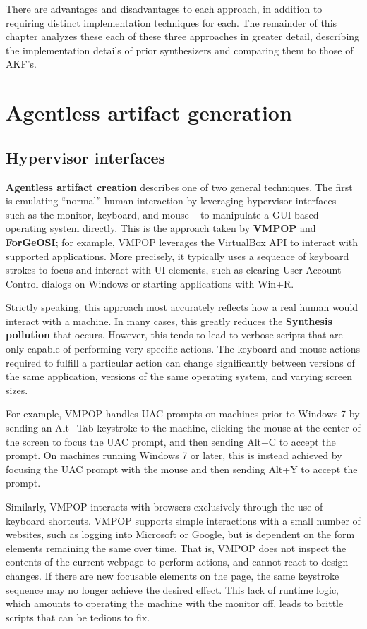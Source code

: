 \documentclass[letterpaper,12pt]{report}
\begin{document}
There are advantages and disadvantages to each approach, in addition to
requiring distinct implementation techniques for each. The remainder of
this chapter analyzes these each of these three approaches in greater
detail, describing the implementation details of prior synthesizers and
comparing them to those of AKF's.

\section{Agentless artifact
generation}\label{agentless-artifact-generation}

\subsection{Hypervisor interfaces}\label{hypervisor-interfaces}

\textbf{Agentless artifact creation} describes one of two general
techniques. The first is emulating ``normal'' human interaction by
leveraging hypervisor interfaces -- such as the monitor, keyboard, and
mouse -- to manipulate a GUI-based operating system directly. This is
the approach taken by \textbf{VMPOP} and \textbf{ForGeOSI}; for example,
VMPOP leverages the VirtualBox API to interact with supported
applications. More precisely, it typically uses a sequence of keyboard
strokes to focus and interact with UI elements, such as clearing User
Account Control dialogs on Windows or starting applications with Win+R.

Strictly speaking, this approach most accurately reflects how a real
human would interact with a machine. In many cases, this greatly reduces
the \textbf{Synthesis pollution} that occurs. However, this tends to
lead to verbose scripts that are only capable of performing very
specific actions. The keyboard and mouse actions required to fulfill a
particular action can change significantly between versions of the same
application, versions of the same operating system, and varying screen
sizes.

For example, VMPOP handles UAC prompts on machines prior to Windows 7 by
sending an Alt+Tab keystroke to the machine, clicking the mouse at the
center of the screen to focus the UAC prompt, and then sending Alt+C to
accept the prompt. On machines running Windows 7 or later, this is
instead achieved by focusing the UAC prompt with the mouse and then
sending Alt+Y to accept the prompt.

Similarly, VMPOP interacts with browsers exclusively through the use of
keyboard shortcuts. VMPOP supports simple interactions with a small
number of websites, such as logging into Microsoft or Google, but is
dependent on the form elements remaining the same over time. That is,
VMPOP does not inspect the contents of the current webpage to perform
actions, and cannot react to design changes. If there are new focusable
elements on the page, the same keystroke sequence may no longer achieve
the desired effect. This lack of runtime logic, which amounts to
operating the machine with the monitor off, leads to brittle scripts
that can be tedious to fix.
\end{document}
